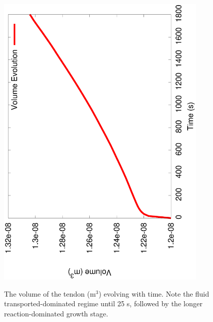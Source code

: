 \begin{figure}[ht]
  \centering
     {\includegraphics[angle=270,width=10.00cm]{images/volume-evolution-3.eps}}
     \caption{The volume of the tendon (m$^3$) evolving with
     time. Note the fluid transported-dominated regime until 25 s,
     followed by the longer reaction-dominated growth stage.}
     \label{volume_evolution}
\end{figure}

